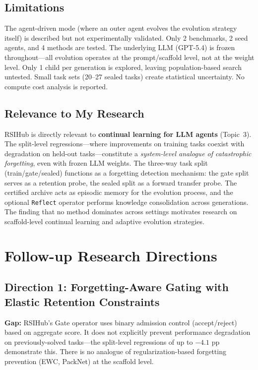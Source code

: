 \documentclass[11pt,a4paper]{article}
\begin{document}
\subsection{Limitations}
The agent-driven mode (where an outer agent evolves the evolution strategy itself) is described but not experimentally validated. Only 2 benchmarks, 2 seed agents, and 4 methods are tested. The underlying LLM (GPT-5.4) is frozen throughout---all evolution operates at the prompt/scaffold level, not at the weight level. Only 1 child per generation is explored, leaving population-based search untested. Small task sets (20--27 sealed tasks) create statistical uncertainty. No compute cost analysis is reported.

\subsection{Relevance to My Research}
RSIHub is directly relevant to \textbf{continual learning for LLM agents} (Topic~3). The split-level regressions---where improvements on training tasks coexist with degradation on held-out tasks---constitute a \emph{system-level analogue of catastrophic forgetting}, even with frozen LLM weights. The three-way task split (train/gate/sealed) functions as a forgetting detection mechanism: the gate split serves as a retention probe, the sealed split as a forward transfer probe. The certified archive acts as episodic memory for the evolution process, and the optional \texttt{Reflect} operator performs knowledge consolidation across generations. The finding that no method dominates across settings motivates research on scaffold-level continual learning and adaptive evolution strategies.

\section{Follow-up Research Directions}

\subsection{Direction 1: Forgetting-Aware Gating with Elastic Retention Constraints}
\textbf{Gap:} RSIHub's Gate operator uses binary admission control (accept/reject) based on aggregate score. It does not explicitly prevent performance degradation on previously-solved tasks---the split-level regressions of up to $-4.1$ pp demonstrate this. There is no analogue of regularization-based forgetting prevention (EWC, PackNet) at the scaffold level.
\end{document}
